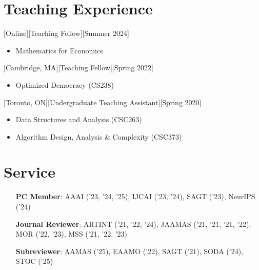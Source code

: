 \documentclass{article}
\begin{document}
    
    \section{Teaching Experience}
    [Online][Teaching Fellow][Summer 2024]
    \begin{itemize}
    	\item Mathematics for Economics
    \end{itemize}
    [Cambridge, MA][Teaching Fellow][Spring 2022]
    \begin{itemize}
        \item Optimized Democracy (CS238)
    \end{itemize}
    
    [Toronto, ON][Undergraduate Teaching Assistant][Spring 2020]
    \begin{itemize}
        \item Data Structures and Analysis (CSC263)
        \item Algorithm Design, Analysis \& Complexity (CSC373)
    \end{itemize}
    
    \section{Service}
    \begin{enumerate}[align=left]
    	\item[\textbf{PC Member}:] AAAI ('23, '24, '25), IJCAI ('23, '24), SAGT ('23), NeurIPS ('24)
    	\item[\textbf{Journal Reviewer}:] ARTINT ('21, '22, '24), JAAMAS ('21, '21, '21, '22), MOR ('22, '23), MSS ('21, '22, '23)
    	\item[\textbf{Subreviewer}:] AAMAS ('25), EAAMO ('22), SAGT ('21), SODA ('24), STOC ('25)
    \end{enumerate}
    
\end{document}
